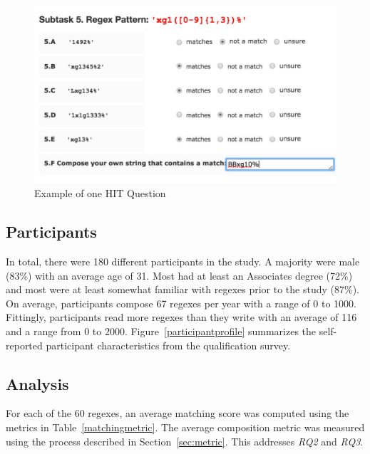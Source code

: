 \begin{figure}[tb]
\centering
\includegraphics[width=\columnwidth]{illustrations/exampleQuestion}
\vspace{-12pt}
\caption{Example of one HIT Question}
\vspace{-6pt}
\label{fig:exampleQuestion}
\end{figure}





\subsection{Participants}

In total, there were 180 different participants in the study.
A majority were male (83\%) with an average age of 31. Most had
at least an Associates degree (72\%) and most were at least somewhat familiar with regexes prior to the study (87\%). On average,
participants compose 67 regexes per year with a range of 0 to 1000. Fittingly, participants read more regexes than they write with an average of 116 and a range from 0 to 2000. Figure~\ref{participantprofile} summarizes the self-reported participant characteristics from the qualification survey.

\subsection{Analysis}
For each of the 60 regexes, an average matching score was computed using the metrics in Table~\ref{matchingmetric}. The average composition metric was measured using the process described in Section~\ref{sec:metric}. This addresses \emph{RQ2} and \emph{RQ3}.

